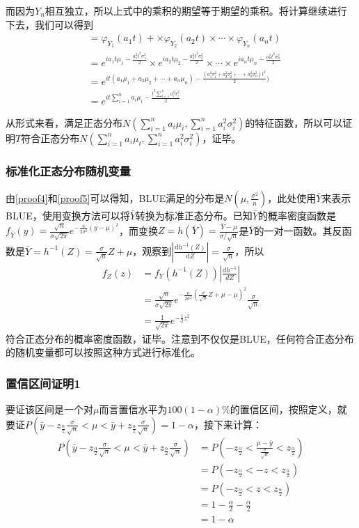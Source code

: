 \documentclass[UTF8]{ctexbook}
\begin{document}
而因为$Y_n$相互独立，所以上式中的乘积的期望等于期望的乘积。将计算继续进行下去，我们可以得到
\begin{align*}
	&=\varphi_{Y_1}(a_1t)+\times\varphi_{Y_2}(a_2t)\times\cdots\times\varphi_{Y_n}(a_nt)\\
	&=e^{ia_1t\mu_1-\frac{a_1^2t^2\sigma_1^2}{2}}\times e^{ia_2t\mu_2-\frac{a_2^2t^2\sigma_2^2}{2}}\times\cdots\times e^{ia_nt\mu_n-\frac{a_n^2t^2\sigma_n^2}{2}}\\
	&=e^{it(a_1\mu_1+a_2\mu_2+\cdots+a_n\mu_n)-\frac{(a_1^2\sigma_1^2+a_2^2\sigma_2^2+\cdots+a_n^2\sigma_n^2)t^2}{2})}\\
	&=e^{it\sum_{i=1}^na_i\mu_i-\frac{t^2\sum_{i=1}^na_i^2\sigma_i^2}{2}}
\end{align*}

从形式来看，满足正态分布$N(\sum_{i=1}^na_i\mu_i, \sum_{i=1}^na_i^2\sigma_i^2)$的特征函数，所以可以证明$T$符合正态分布$N(\sum_{i=1}^na_i\mu_i, \sum_{i=1}^na_i^2\sigma_i^2)$，证毕。

\subsubsection{标准化正态分布随机变量}
\label{proof6}
由\ref{proof4}和\ref{proof5}可以得知，BLUE满足的分布是$N(\mu, \frac{\sigma^2}{n})$，此处使用$\bar Y$来表示BLUE，使用变换方法可以将$\bar Y$转换为标准正态分布。已知$\bar Y$的概率密度函数是$f_{\bar Y}(y)=\frac{\sqrt{n}}{\sigma\sqrt{2\pi}}e^{-\frac{n}{2\sigma^2}(y-\mu)^2}$，而变换$Z=h(\bar Y)=\frac{\bar Y-\mu}{\sigma/\sqrt{n}}$是$\bar Y$的一对一函数。其反函数是$\bar Y=h^{-1}(Z)=\frac{\sigma}{\sqrt n}Z+\mu$，观察到$\left|\frac{\mathrm dh^{-1}(Z)}{\mathrm dZ}\right|=\frac{\sigma}{\sqrt n}$，所以
\begin{align*}
	f_Z(z)&=f_Y(h^{-1}(Z))\left|\frac{dh^{-1}}{dZ}\right|\\
	&=\frac{\sqrt{n}}{\sigma\sqrt{2\pi}}e^{-\frac{n}{2\sigma^2}(\frac{\sigma}{\sqrt n}Z+\mu-\mu)^2}\frac{\sigma}{\sqrt n}\\
	&=\frac{1}{\sqrt{2\pi}}e^{-\frac{1}{2}z^2}
\end{align*}
符合正态分布的概率密度函数，证毕。注意到不仅仅是BLUE，任何符合正态分布的随机变量都可以按照这种方式进行标准化。
\subsubsection{置信区间证明1}
\label{proof7}
要证该区间是一个对$\mu$而言置信水平为$100(1-\alpha)\%$的置信区间，按照定义，就要证$P(\bar y-z_{\frac{\alpha}{2}}\frac{\sigma}{\sqrt n}<\mu<\bar y+z_{\frac{\alpha}{2}}\frac{\sigma}{\sqrt n})=1-\alpha$，接下来计算：
\begin{align*}
	P(\bar y-z_{\frac{\alpha}{2}}\frac{\sigma}{\sqrt n}<\mu<\bar y+z_{\frac{\alpha}{2}}\frac{\sigma}{\sqrt n})&=P(-z_\frac{\alpha}{2}<\frac{\mu-\bar y}{\frac{\sigma}{\sqrt n}}<z_\frac{\alpha}{2})\\
	&=P(-z_\frac{\alpha}{2}<-z<z_\frac{\alpha}{2})\\
	&=P(-z_\frac{\alpha}{2}<z<z_\frac{\alpha}{2})\\
	&=1-\frac{\alpha}{2}-\frac{\alpha}{2}\\
	&=1-\alpha
\end{align*}
\end{document}

